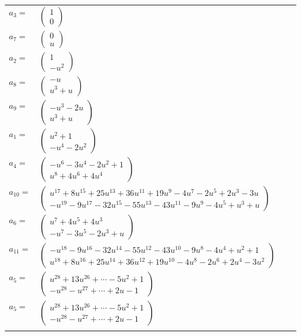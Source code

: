 \documentclass[1p]{elsarticle_modified}
\theoremstyle{definition}
\begin{document}
\begin{tabular}{m{7pt} m{180pt} m{7pt} m{180pt} }
\flushright $a_{3}=$&$\begin{pmatrix}1\\0\end{pmatrix}$ \\
\flushright $a_{7}=$&$\begin{pmatrix}0\\u\end{pmatrix}$ \\
\flushright $a_{2}=$&$\begin{pmatrix}1\\- u^2\end{pmatrix}$ \\
\flushright $a_{8}=$&$\begin{pmatrix}- u\\u^3+u\end{pmatrix}$ \\
\flushright $a_{9}=$&$\begin{pmatrix}- u^3-2 u\\u^3+u\end{pmatrix}$ \\
\flushright $a_{1}=$&$\begin{pmatrix}u^2+1\\- u^4-2 u^2\end{pmatrix}$ \\
\flushright $a_{4}=$&$\begin{pmatrix}- u^6-3 u^4-2 u^2+1\\u^8+4 u^6+4 u^4\end{pmatrix}$ \\
\flushright $a_{10}=$&$\begin{pmatrix}u^{17}+8 u^{15}+25 u^{13}+36 u^{11}+19 u^9-4 u^7-2 u^5+2 u^3-3 u\\- u^{19}-9 u^{17}-32 u^{15}-55 u^{13}-43 u^{11}-9 u^9-4 u^5+u^3+u\end{pmatrix}$ \\
\flushright $a_{6}=$&$\begin{pmatrix}u^7+4 u^5+4 u^3\\- u^7-3 u^5-2 u^3+u\end{pmatrix}$ \\
\flushright $a_{11}=$&$\begin{pmatrix}- u^{18}-9 u^{16}-32 u^{14}-55 u^{12}-43 u^{10}-9 u^8-4 u^4+u^2+1\\u^{18}+8 u^{16}+25 u^{14}+36 u^{12}+19 u^{10}-4 u^8-2 u^6+2 u^4-3 u^2\end{pmatrix}$ \\
\flushright $a_{5}=$&$\begin{pmatrix}u^{28}+13 u^{26}+\cdots-5 u^2+1\\- u^{28}- u^{27}+\cdots+2 u-1\end{pmatrix}$\\ \flushright $a_{5}=$&$\begin{pmatrix}u^{28}+13 u^{26}+\cdots-5 u^2+1\\- u^{28}- u^{27}+\cdots+2 u-1\end{pmatrix}$\\&\end{tabular}
\end{document}
